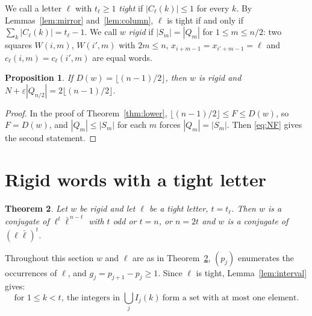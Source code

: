 \documentclass[11pt,reqno]{amsart}
\newtheorem{theorem}{Theorem}[section]
\newtheorem{proposition}[theorem]{Proposition}
\theoremstyle{definition}
\newcommand{\lb}{\bar\ell}
\newcommand{\fl}[1]{\lfloor #1\rfloor}
\begin{document}
We call a letter $\ell$ with $t_\ell\ge 1$ \emph{tight} if $|C_\ell(k)|\le 1$ for every $k$. By Lemmas~\ref{lem:mirror} and~\ref{lem:column}, $\ell$ is tight if and only if $\sum_k|C_\ell(k)|=t_\ell-1$. We call $w$ \emph{rigid} if $|S_m|=|Q_m|$ for $1\le m\le n/2$: two squares $W(i,m)$, $W(i',m)$ with $2m\le n$, $x_{i+m-1}=x_{i'+m-1}=\ell$ and $c_\ell(i,m)=c_\ell(i',m)$ are equal words.

\begin{proposition}\label{prop:equality}
If $D(w)=\fl{(n-1)/2}$, then $w$ is rigid and $N+\varepsilon|Q_{n/2}|=2\fl{(n-1)/2}$.
\end{proposition}

\begin{proof}
In the proof of Theorem~\ref{thm:lower}, $\fl{(n-1)/2}\le F\le D(w)$, so $F=D(w)$, and $|Q_m|\le|S_m|$ for each $m$ forces $|Q_m|=|S_m|$. Then \eqref{eq:NF} gives the second statement.
\end{proof}

\section{Rigid words with a tight letter}\label{sec:tight}

\begin{theorem}\label{thm:classify}
Let $w$ be rigid and let $\ell$ be a tight letter, $t=t_\ell$. Then $w$ is a conjugate of $\ell^t\lb^{\,n-t}$ with $t$ odd or $t=n$, or $n=2t$ and $w$ is a conjugate of $(\ell\lb)^t$.
\end{theorem}

Throughout this section $w$ and $\ell$ are as in Theorem~\ref{thm:classify}, $(p_j)$ enumerates the occurrences of $\ell$, and $g_j=p_{j+1}-p_j\ge 1$. Since $\ell$ is tight, Lemma~\ref{lem:interval} gives:
\begin{equation}\label{eq:tight}
\text{for } 1\le k<t,\ \text{the integers in } \textstyle\bigcup_j I_j(k)\ \text{form a set with at most one element.}
\end{equation}
\end{document}
